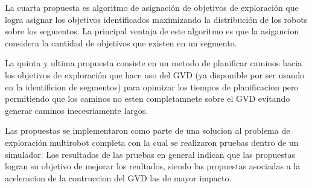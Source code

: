 La cuarta propuesta es algoritmo de asignación de objetivos de exploración que
logra asignar los objetivos identificados maximizando la distribución de los
robots sobre los segmentos. La principal ventaja de este algoritmo es que la
asigancion considera la cantidad de objetivos que existen en un segmento.

La quinta y ultima propuesta consiste en un metodo de planificar caminos hacia
los objetivos de exploración que hace uso del GVD (ya disponible por ser usando
en la identificion de segmentos) para opimizar los tiempos de planificacion
pero permitiendo que los caminos no esten completamnete sobre el GVD evitando
generar caminos inecesriamente largos.

Las propuestas se implementaron como parte de una solucion al problema de
exploración multirobot completa con la cual se realizaron pruebas dentro de un
simulador. Los resultados de las pruebas en general indican que las propuestas
logran su objetivo de mejorar los reultados, siendo las propuestas asociadas a
la aceleracion de la contruccion del GVD las de mayor impacto.

